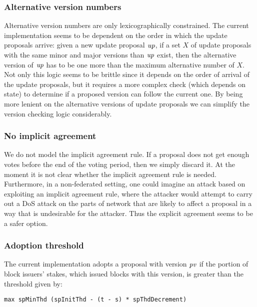 \subsubsection{Alternative version numbers}
\label{sec:alt-version-numbers-constraints}

Alternative version numbers are only lexicographically constrained. The current
implementation seems to be dependent on the order in which the update proposals
arrive: given a new update proposal $\mathit{up}$, if a set $X$ of update
proposals with the same minor and major versions than $\mathit{up}$ exist, then
the alternative version of $\mathit{up}$ has to be one more than the maximum
alternative number of $X$. Not only this logic seems to be brittle since it
depends on the order of arrival of the update proposals, but it requires a more
complex check (which depends on state) to determine if a proposed version can
follow the current one. By being more lenient on the alternative versions of
update proposals we can simplify the version checking logic considerably.

\subsubsection{No implicit agreement}
\label{sec:no-implicit-agreement}

We do not model the implicit agreement rule. If a proposal does not get enough
votes before the end of the voting period, then we simply discard it. At the
moment it is not clear whether the implicit agreement rule is needed.
Furthermore, in a non-federated setting, one could imagine an attack based on
exploiting an implicit agreement rule, where the attacker would attempt to
carry out a DoS attack on the parts of network that are likely to affect a
proposal in a way that is undesirable for the attacker. Thus the explicit
agreement seems to be a safer option.

\subsubsection{Adoption threshold}
\label{sec:adoption-threshold}

The current implementation adopts a proposal with version $\mathit{pv}$ if the
portion of block issuers' stakes, which issued blocks with this version, is
greater than the threshold given by:

\begin{lstlisting}
max spMinThd (spInitThd - (t - s) * spThdDecrement)
\end{lstlisting}

